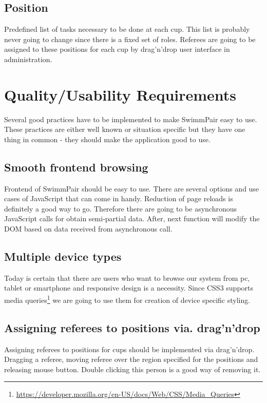 \subsection*{Position}
Predefined list of tasks necessary to be done at each cup. This list is probably never going to change since there is a fixed set of roles. Referees are going to be assigned to these positions for each cup by drag'n'drop user interface in administration.
\newpage
\section{Quality/Usability Requirements}
Several good practices have to be implemented to make SwimmPair easy to use. These practices are either well known or situation specific but they have one thing in common - they should make the application good to use.
\subsection*{Smooth frontend browsing}
\par
Frontend of SwimmPair should be easy to use. There are several options and use cases of JavaScript that can come in handy. Reduction of page reloads is definitely a good way to go. Therefore there are going to be asynchronous JavaScript calls for obtain semi-partial data. After, next function will modify the DOM based on data received from asynchronous call. 
\subsection*{Multiple device types}
\par
Today is certain that there are users who want to browse our system from pc, tablet or smartphone and responsive design is a necessity. Since CSS3 supports media queries\footnote{\url{https://developer.mozilla.org/en-US/docs/Web/CSS/Media_Queries}} we are going to use them for creation of device specific styling.
\subsection*{Assigning referees to positions via. drag'n'drop}
\par
Assigning referees to positions for cups should be implemented via drag'n'drop. Dragging a referee, moving referee over the region specified for the positions and releasing mouse button. Double clicking this person is a good way of removing it.
